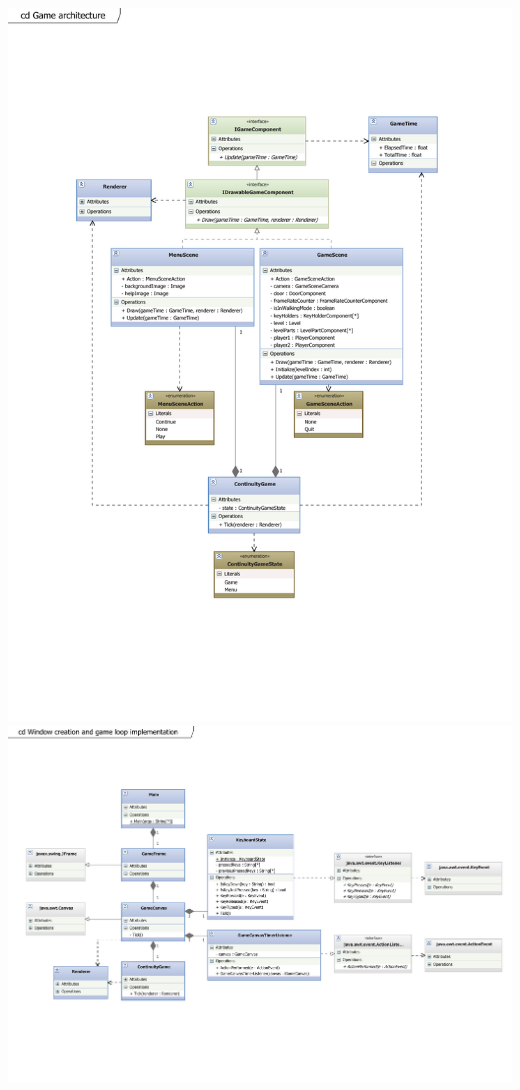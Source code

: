 \begin{center}
\includegraphics[scale=0.7]{GameArchitecture.pdf}
\newpage
\includegraphics[scale=0.7,angle=90]{Main.pdf}

\end{center}
